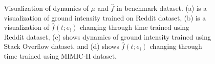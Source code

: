 \begin{figure}[ht]
    \hfill
    \caption{Visualization of dynamics of $\mu$ and $\hat{f}$ in benchmark dataset. (a) is a visualization of ground intensity trained on Reddit dataset, (b) is a visualization of $\hat{f}(t;e_i)$ changing through time trained using Reddit dataset, (c) shows dynamics of ground intensity trained using Stack Overflow dataset, and (d) shows $\hat{f}(t; e_i)$ changing through time trained using MIMIC-II dataset.}
    \label{fig:mooc}

\end{figure}

